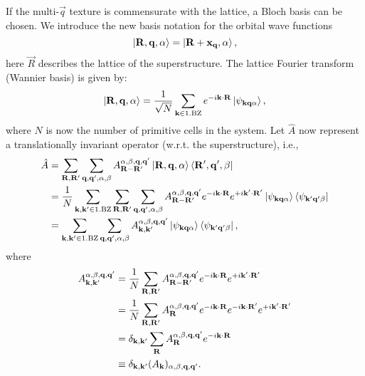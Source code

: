 \documentclass[
    aps,
    prb,
    twocolumn,
    floatfix,
    superscriptaddress,
	10pt
]{revtex4-2}
\begin{document}
If the multi-$\vec{q}$ texture is commensurate with the lattice, a Bloch basis can be chosen.
We introduce the new basis notation for the orbital wave functions
\begin{equation}
	\ket{\vec{R}, \vec{q}, \alpha} = \ket{\vec{R}+\vec{x}_{\vec{q}}, \alpha} ,
\end{equation}
here $\vec{R}$ describes the lattice of the superstructure.
The lattice Fourier transform (Wannier basis) is given by:
\begin{equation}
	\ket{\vec{R}, \vec{q}, \alpha} = \frac{1}{\sqrt{N}}
	\sum_{\vec{k} \in \mathrm{1. BZ}} e^{-i \vec{k}\cdot\vec{R}} 
	\ket{\psi_{\vec{k} \vec{q} \alpha}},
\end{equation}
where $N$ is now the number of primitive cells in the system.
Let $\hat{A}$ now represent a translationally invariant operator (w.r.t. the superstructure), i.e.,
\begin{align}
	\hat{A} & = \sum_{\vec{R}, \vec{R}'} \sum_{\vec{q}, \vec{q}' , \alpha, \beta}
	A_{\vec{R}-\vec{R}'}^{ \alpha, \beta, \vec{q}, \vec{q}'} \ket{\vec{R}, \vec{q}, \alpha} \bra{\vec{R}',\vec{q}', \beta}
	\notag \\
	&= \frac{1}{N} \sum_{\vec{k}, \vec{k}' \in \mathrm{1. BZ}}
	\sum_{\vec{R}, \vec{R}'} \sum_{\vec{q}, \vec{q}' , \alpha, \beta}
	A_{\vec{R}-\vec{R}'}^{ \alpha, \beta, \vec{q}, \vec{q}'} 
	e^{-i \vec{k}\cdot\vec{R}} 
	e^{+i \vec{k}'\cdot\vec{R}'} 
	\ket{\psi_{\vec{k} \vec{q} \alpha}} \bra{\psi_{\vec{k}' \vec{q}' \beta}}
	\notag \\
	&=  \sum_{\vec{k}, \vec{k}' \in \mathrm{1. BZ}}
	 \sum_{\vec{q}, \vec{q}' , \alpha, \beta}
	A_{\vec{k}, \vec{k}'}^{ \alpha, \beta, \vec{q}, \vec{q}'} 
	\ket{\psi_{\vec{k} \vec{q} \alpha}} \bra{\psi_{\vec{k}' \vec{q}' \beta}},
\end{align}
where 
\begin{align}
	A_{\vec{k}, \vec{k}'}^{ \alpha, \beta, \vec{q}, \vec{q}'} 
	& =  \frac{1}{N}
	\sum_{\vec{R}, \vec{R}'}A_{\vec{R}-\vec{R}'}^{ \alpha, \beta, \vec{q}, \vec{q}'} 
	e^{-i \vec{k}\cdot\vec{R}} 
	e^{+i \vec{k}'\cdot\vec{R}'} 
	\notag \\
	& =  \frac{1}{N}
	\sum_{\vec{R}, \vec{R}'}A_{\vec{R}}^{ \alpha, \beta, \vec{q}, \vec{q}'} 
	e^{-i \vec{k}\cdot\vec{R}} 
	e^{-i \vec{k}\cdot\vec{R}'} 
	e^{+i \vec{k}'\cdot\vec{R}'} 
	\notag \\
	& =   \delta_{\vec{k}, \vec{k}'}
	\sum_{\vec{R}}A_{\vec{R}}^{ \alpha, \beta, \vec{q}, \vec{q}'} 
	e^{-i \vec{k}\cdot\vec{R}} 
	\notag \\
	& \equiv   \delta_{\vec{k}, \vec{k}'}
	(A_{\vec{k}})_{ \alpha, \beta, \vec{q}, \vec{q}'} .
\end{align}
\end{document}
